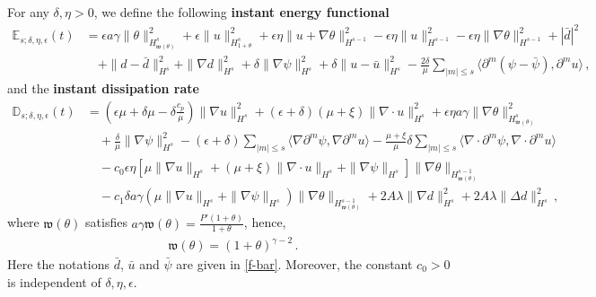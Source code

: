 \documentclass[reqno,11pt]{amsart}
\numberwithin{equation}{section}
\def\w{\mathfrak{w}}
\begin{document}
For any $\delta,\eta>0$, we define the following {\bf instant energy functional}
\begin{equation}\label{close-eq7}
\begin{aligned}
\mathbb{E}_{s;\delta,\eta, \epsilon}(t)&=\epsilon a \gamma \|\theta\|_{H_{ \w (\theta) }^s}^2 + \epsilon \|u\|_{H_{1+\theta}^s}^2 + \epsilon \eta \|u + \nabla \theta\|_{H^{s-1}}^2 - \epsilon \eta \|u\|_{H^{s-1}}^2 - \epsilon \eta \|\nabla \theta\|_{H^{s-1}}^2 + |\bar{d}|^2 \\
& \quad + \|d - \bar{d}\|_{H^s}^2 + \|\nabla d\|_{H^s}^2 + \delta \|\nabla \psi\|_{H^s}^2 + \delta \|u - \bar{u}\|_{H^s}^2 - \frac{2\delta}{\mu} \sum_{|m| \leq s} \langle \partial^m (\psi - \bar{\psi}), \partial^m u \rangle \,,
\end{aligned}
\end{equation}
and the {\bf instant dissipation rate} 
\begin{equation}\label{close-eq8}
\begin{aligned}
\mathbb{D}_{s;\delta,\eta, \epsilon} (t) & = (\epsilon \mu + \delta \mu  - \delta \frac{c_p}{\mu} ) \|\nabla u\|_{H^s}^2 + (\epsilon + \delta) (\mu + \xi ) \|\nabla \cdot u\|_{H^s}^2 + \epsilon \eta a \gamma \|\nabla \theta\|_{H_{ \w (\theta) }^s }^2 \\
& \quad + \frac{\delta}{\mu} \| \nabla \psi\|_{H^s}^2 - (\epsilon + \delta) \sum_{|m| \leq s} \langle \nabla \partial^m \psi, \nabla \partial^m u \rangle - \frac{\mu + \xi}{\mu} \delta \sum_{|m| \leq s} \langle \nabla \cdot \partial^m \psi, \nabla \cdot \partial^m u \rangle \\
& \quad - c_0 \epsilon \eta [ \mu \| \nabla u \|_{H^s} + (\mu + \xi) \| \nabla \cdot u \|_{H^s} + \| \nabla \psi \|_{H^s} ] \| \nabla \theta \|_{ H^{s-1}_{ \w (\theta) } } \\
& \quad - c_1 \delta a \gamma ( \mu \| \nabla u \|_{H^s} + \| \nabla \psi \|_{H^s} ) \| \nabla \theta \|_{ H^{s-1}_{ \w (\theta) } }  + 2A\lambda \|\nabla d\|_{H^s}^2 + 2A\lambda \|\Delta d\|_{H^s}^2 \,,
\end{aligned}
\end{equation}
where $\w (\theta)$ satisfies $a \gamma \w (\theta) = \frac{P' (1 + \theta)}{1 + \theta}$, hence, 
\begin{equation}\label{w-weight}
  \begin{aligned}
    \w (\theta) = (1 + \theta)^{\gamma - 2} \,.
  \end{aligned}
\end{equation}
Here the notations $\bar{d}$, $\bar{u}$ and $\bar{\psi}$ are given in \eqref{f-bar}. Moreover, the constant $c_0 > 0$ is independent of $\delta, \eta, \epsilon$. 
\end{document}
